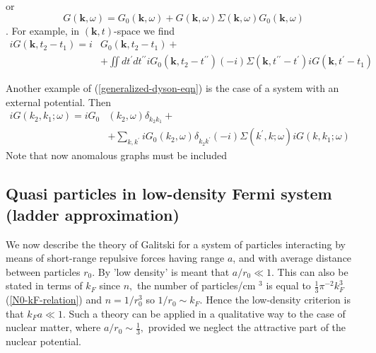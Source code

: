 or
\begin{equation}G(\mathbf{k}, \omega)=G_{0}(\mathbf{k}, \omega)+G(\mathbf{k}, \omega) \Sigma(\mathbf{k}, \omega) G_{0}(\mathbf{k}, \omega)\end{equation}
. For example, in $(\mathbf{k},t)$-space we find
\begin{equation}\begin{aligned}
i G\left(\mathbf{k}, t_{2}-t_{1}\right)=i &G_{0}\left(\mathbf{k}, t_{2}-t_{1}\right)+\\
&+\iint d t^{\prime} d t^{\prime \prime} i G_{0}\left(\mathbf{k}, t_{2}-t^{\prime \prime}\right)(-i) \Sigma\left(\mathbf{k}, t^{\prime \prime}-t^{\prime}\right) i G\left(\mathbf{k}, t^{\prime}-t_{1}\right)
\end{aligned}\end{equation}

Another example of (\ref{generalized-dyson-eqn}) is the case of a system with an external potential. Then
\begin{equation}\begin{aligned}
i G\left(k_{2}, k_{1} ; \omega\right)=i G_{0}&\left(k_{2}, \omega\right) \delta_{k_{2} k_{1}}+& \\
&+\sum_{k, k^{\prime}} i G_{0}\left(k_{2}, \omega\right) \delta_{k_{2} k^{\prime}}(-i) \Sigma\left(k^{\prime}, k ; \omega\right) i G\left(k, k_{1} ; \omega\right)
\end{aligned}\end{equation}
Note that now anomalous graphs must be included

\subsection{Quasi particles in low-density Fermi system (ladder approximation)}
We now describe the theory of Galitski for a system of particles interacting by means of short-range repulsive forces having range $a$, and with average distance between particles $r_0$. By 'low density' is meant that $a / r_{0} \ll 1 .$ This can also be stated in terms of $k_{F}$ since $n,$ the number of particles/cm $^{3}$ is equal to $\frac{1}{3} \pi^{-2} k_{F}^{3}$(\ref{N0-kF-relation}) and $n=1 / r_{0}^{3}$ so $1 / r_{0} \sim k_{F} .$ Hence the low-density criterion is that $k_{F} a \ll 1 .$ Such a theory can be applied in a qualitative way to the case of nuclear matter, where $a / r_{0} \sim \frac{1}{3},$ provided we neglect the attractive part of the nuclear potential.

